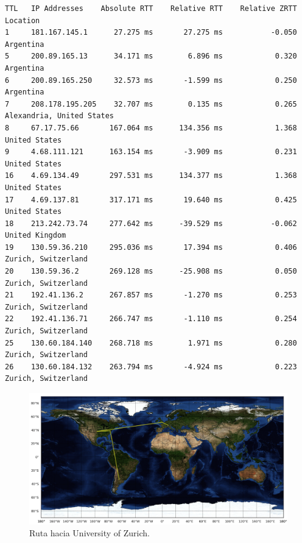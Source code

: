 \documentclass[10pt, a4paper]{article}
\begin{document}
\begin{verbatim}
TTL   IP Addresses    Absolute RTT    Relative RTT    Relative ZRTT  Location
1     181.167.145.1      27.275 ms       27.275 ms           -0.050  Argentina
5     200.89.165.13      34.171 ms        6.896 ms            0.320  Argentina
6     200.89.165.250     32.573 ms       -1.599 ms            0.250  Argentina
7     208.178.195.205    32.707 ms        0.135 ms            0.265  Alexandria, United States
8     67.17.75.66       167.064 ms      134.356 ms            1.368  United States
9     4.68.111.121      163.154 ms       -3.909 ms            0.231  United States
16    4.69.134.49       297.531 ms      134.377 ms            1.368  United States
17    4.69.137.81       317.171 ms       19.640 ms            0.425  United States
18    213.242.73.74     277.642 ms      -39.529 ms           -0.062  United Kingdom
19    130.59.36.210     295.036 ms       17.394 ms            0.406  Zurich, Switzerland
20    130.59.36.2       269.128 ms      -25.908 ms            0.050  Zurich, Switzerland
21    192.41.136.2      267.857 ms       -1.270 ms            0.253  Zurich, Switzerland
22    192.41.136.71     266.747 ms       -1.110 ms            0.254  Zurich, Switzerland
25    130.60.184.140    268.718 ms        1.971 ms            0.280  Zurich, Switzerland
26    130.60.184.132    263.794 ms       -4.924 ms            0.223  Zurich, Switzerland

\end{verbatim}

\begin{figure}[H] %
\begin{center}
\includegraphics[width=400pt]{../imgs/map-uzh.png}
\caption{Ruta hacia University of Zurich.}
\end{center}
\end{figure}
\end{document}
